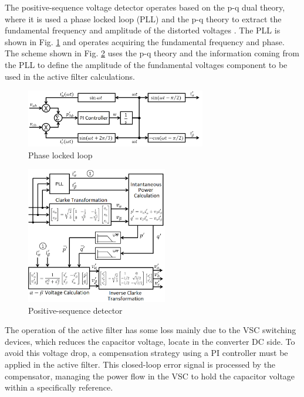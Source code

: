 The positive-sequence voltage detector operates based on the p-q dual theory, where it is used a phase locked loop (PLL) and the p-q theory to extract the fundamental frequency and amplitude of the distorted voltages \citep{Akagi2007}. The PLL is shown in Fig. \ref{fig:PLL.png} and operates acquiring the fundamental frequency and phase. The scheme shown in Fig. \ref{fig:detector_seq_positiva.png} uses the p-q theory and the information coming from the PLL to define the amplitude of the fundamental voltages component to be used in the active filter calculations.


\begin{figure}[!b]
	\centering
	\includegraphics[width=0.70\textwidth]{Figures/PLL.png}
	\caption{Phase locked loop}
	\label{fig:PLL.png}
\end{figure}

\begin{figure}[!b]
	\centering
	\includegraphics[width=0.55\textwidth]{Figures/detector_seq_positiva.png}
	\caption{Positive-sequence detector}
	\label{fig:detector_seq_positiva.png}
\end{figure}

The operation of the active filter has some loss mainly due to the VSC switching devices, which reduces the capacitor voltage, locate in the converter DC side. To avoid this voltage drop, a compensation strategy using a PI controller must be applied in the active filter. This closed-loop error signal is processed by the compensator, managing the power flow in the VSC to hold the capacitor voltage within a specifically reference.
